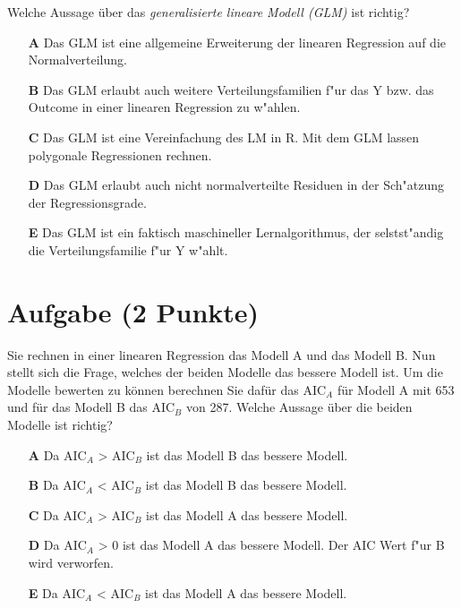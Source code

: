 \documentclass[a4paper, 10pt]{scrartcl}\usepackage[]{graphicx}\usepackage[]{xcolor}
\begin{document}
Welche Aussage {\"u}ber das \textit{generalisierte lineare Modell (GLM)} ist richtig?  



\begin{enumerate}
\item [\textbf{A} \msquare] Das GLM ist eine allgemeine Erweiterung der linearen Regression auf die Normalverteilung.
\item [\textbf{B} \msquare] Das GLM erlaubt auch weitere Verteilungsfamilien f{"u}r das Y bzw. das Outcome in einer linearen Regression zu w{"a}hlen.
\item [\textbf{C} \msquare] Das GLM ist eine Vereinfachung des LM in R. Mit dem GLM lassen polygonale Regressionen rechnen.
\item [\textbf{D} \msquare] Das GLM erlaubt auch nicht normalverteilte Residuen in der Sch{"a}tzung der Regressionsgrade.
\item [\textbf{E} \msquare] Das GLM ist ein faktisch maschineller Lernalgorithmus, der selstst{"a}ndig die Verteilungsfamilie f{"u}r Y w{"a}hlt.
\end{enumerate}

\section{Aufgabe \hfill (2 Punkte)}



Sie rechnen in einer linearen Regression das Modell A und das Modell B. Nun
stellt sich die Frage, welches der beiden Modelle das bessere Modell
ist. Um die Modelle bewerten zu k{\"o}nnen berechnen Sie daf{\"u}r das AIC$_A$ f{\"u}r
Modell A mit 653 und f{\"u}r das Modell B das AIC$_B$ von
287. Welche Aussage {\"u}ber die beiden Modelle ist richtig?



\begin{enumerate}
\item [\textbf{A} \msquare] Da AIC$_A$ > AIC$_B$ ist das Modell B das bessere Modell.
\item [\textbf{B} \msquare] Da AIC$_A$ < AIC$_B$ ist das Modell B das bessere Modell.
\item [\textbf{C} \msquare] Da AIC$_A$ > AIC$_B$ ist das Modell A das bessere Modell.
\item [\textbf{D} \msquare] Da AIC$_A$ > 0 ist das Modell A das bessere Modell. Der AIC Wert f{"u}r B wird verworfen.
\item [\textbf{E} \msquare] Da AIC$_A$ < AIC$_B$ ist das Modell A das bessere Modell.
\end{enumerate}
\end{document}
